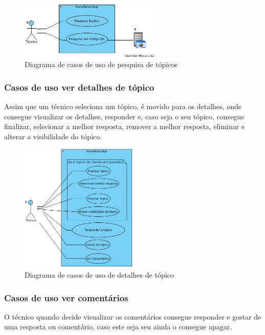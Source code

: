 \begin{figure}[htb]
  \centering
  \includegraphics[width=0.6\textwidth]{images/diagramas/casos_de_uso/use_case_forum_search.png}
  \caption{Diagrama de casos de uso de pesquisa de tópicos}
  \label{fig:13}
\end{figure}

\subsubsection{Casos de uso ver detalhes de tópico}

Assim que um técnico seleciona um tópico, é movido para os 
detalhes, onde consegue visualizar os detalhes, responder e, caso seja o seu tópico, consegue finalizar, selecionar a melhor resposta, remover a melhor resposta, eliminar e alterar a visibilidade do tópico.

\begin{figure}[htb]
  \centering
  
  \includegraphics[width=0.5\textwidth]{images/diagramas/casos_de_uso/use_case_topic_details.png}
  \caption{Diagrama de casos de uso de detalhes de tópico}
  \label{fig:14}
\end{figure}

\subsubsection{Casos de uso ver comentários}

O técnico quando decide visualizar os comentários consegue responder e gostar de uma resposta ou comentário, caso este seja seu ainda o consegue apagar.

